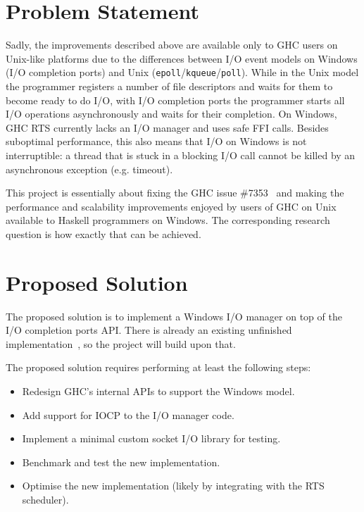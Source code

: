 \documentclass[10pt, oneside]{article}
\begin{document}
\section{Problem Statement}
\label{sec:problem}

Sadly, the improvements described above are available only to GHC users on
Unix-like platforms due to the differences between I/O event models on Windows
(I/O completion ports) and Unix
(\texttt{epoll}/\texttt{kqueue}/\texttt{poll}). While in the Unix model the
programmer registers a number of file descriptors and waits for them to become
ready to do I/O, with I/O completion ports the programmer starts all I/O
operations asynchronously and waits for their completion. On Windows, GHC RTS
currently lacks an I/O manager and uses safe FFI calls. Besides suboptimal
performance, this also means that I/O on Windows is not interruptible: a thread
that is stuck in a blocking I/O call cannot be killed by an asynchronous
exception (e.g. timeout).

This project is essentially about fixing the GHC issue \#7353~\cite{bib:ticket}
and making the performance and scalability improvements enjoyed by users of GHC
on Unix available to Haskell programmers on Windows. The corresponding research
question is how exactly that can be achieved.

\section{Proposed Solution}
\label{sec:solution}

The proposed solution is to implement a Windows I/O manager on top of the I/O
completion ports API. There is already an existing unfinished
implementation~\cite{bib:ticket}, so the project will build upon that.

The proposed solution requires performing at least the following steps:

\begin{itemize}
\item Redesign GHC's internal APIs to support the Windows model.
\item Add support for IOCP to the I/O manager code.
\item Implement a minimal custom socket I/O library for testing.
\item Benchmark and test the new implementation.
\item Optimise the new implementation (likely by integrating with the RTS
  scheduler).
\end{itemize}
\end{document}
